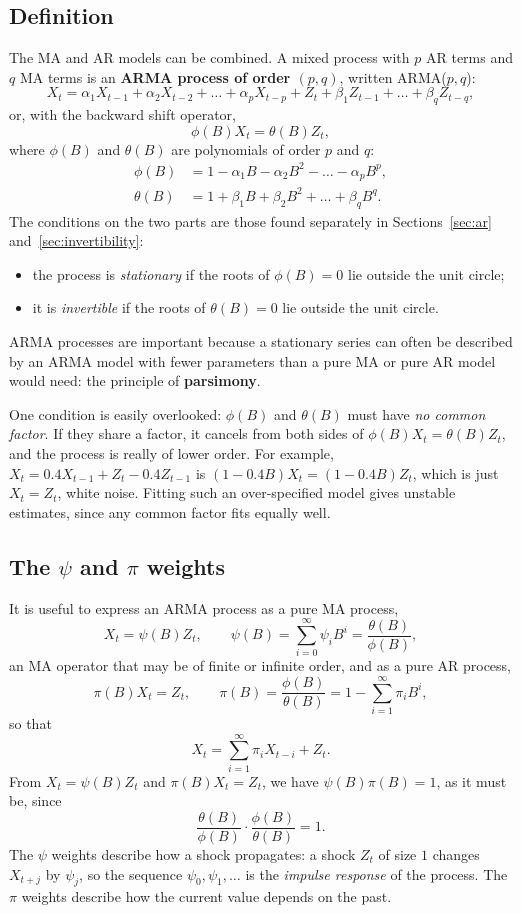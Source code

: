 \documentclass[11pt,a4paper]{article}
\theoremstyle{definition}
\begin{document}
\subsection{Definition}
The MA and AR models can be combined. A mixed process with $p$ AR terms and $q$ MA terms is an \textbf{ARMA process of
order $(p, q)$}, written ARMA($p, q$):
\[
X_t = \alpha_1X_{t-1} + \alpha_2X_{t-2} + \dots + \alpha_pX_{t-p} + Z_t + \beta_1Z_{t-1} + \dots + \beta_qZ_{t-q} ,
\]
or, with the backward shift operator,
\[
\phi(B)X_t = \theta(B)Z_t ,
\]
where $\phi(B)$ and $\theta(B)$ are polynomials of order $p$ and $q$:
\begin{align*}
\phi(B) &= 1 - \alpha_1B - \alpha_2B^2 - \dots - \alpha_pB^p , \\
\theta(B) &= 1 + \beta_1B + \beta_2B^2 + \dots + \beta_qB^q .
\end{align*}
The conditions on the two parts are those found separately in Sections~\ref{sec:ar} and~\ref{sec:invertibility}:
\begin{itemize}
\item the process is \emph{stationary} if the roots of $\phi(B) = 0$ lie outside the unit circle;
\item it is \emph{invertible} if the roots of $\theta(B) = 0$ lie outside the unit circle.
\end{itemize}
ARMA processes are important because a stationary series can often be described by an ARMA model with fewer
parameters than a pure MA or pure AR model would need: the principle of \textbf{parsimony}.

One condition is easily overlooked: $\phi(B)$ and $\theta(B)$ must have \emph{no common factor}. If they share a factor, it cancels
from both sides of $\phi(B)X_t = \theta(B)Z_t$, and the process is really of lower order. For example,
$X_t = 0.4X_{t-1} + Z_t - 0.4Z_{t-1}$ is $(1 - 0.4B)X_t = (1 - 0.4B)Z_t$, which is just $X_t = Z_t$, white noise. Fitting such an over-specified
model gives unstable estimates, since any common factor fits equally well.

\subsection{The $\psi$ and $\pi$ weights}
It is useful to express an ARMA process as a pure MA process,
\[
X_t = \psi(B)Z_t , \qquad \psi(B) = \sum_{i=0}^\infty\psi_iB^i = \frac{\theta(B)}{\phi(B)} ,
\]
an MA operator that may be of finite or infinite order, and as a pure AR process,
\[
\pi(B)X_t = Z_t , \qquad \pi(B) = \frac{\phi(B)}{\theta(B)} = 1 - \sum_{i=1}^\infty\pi_iB^i ,
\]
so that
\[
X_t = \sum_{i=1}^\infty\pi_iX_{t-i} + Z_t .
\]
From $X_t = \psi(B)Z_t$ and $\pi(B)X_t = Z_t$, we have $\psi(B)\pi(B) = 1$, as it must be, since
\[
\frac{\theta(B)}{\phi(B)}\cdot\frac{\phi(B)}{\theta(B)} = 1 .
\]
The $\psi$ weights describe how a shock propagates: a shock $Z_t$ of size $1$ changes $X_{t+j}$ by $\psi_j$, so the sequence $\psi_0, \psi_1, \dots$ is the
\emph{impulse response} of the process. The $\pi$ weights describe how the current value depends on the past.
\end{document}
